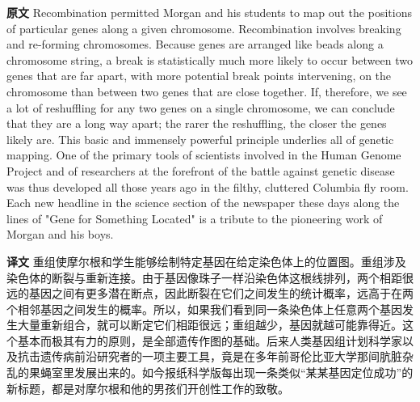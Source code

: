 \documentclass[UTF8,zihao=-4]{ctexart}
\newcommand{\BodyFont}{\fontsize{10.5pt}{15.5pt}\selectfont}
\renewenvironment{quote}{\par\noindent\begingroup\BodyFont}{\par\endgroup}
\begin{document}
\begin{quote}
\noindent\textbf{原文} Recombination permitted Morgan and his students to map out the positions of particular genes along a given chromosome. Recombination involves breaking and re-forming chromosomes. Because genes are arranged like beads along a chromosome string, a break is statistically much more likely to occur between two genes that are far apart, with more potential break points intervening, on the chromosome than between two genes that are close together. If, therefore, we see a lot of reshuffling for any two genes on a single chromosome, we can conclude that they are a long way apart; the rarer the reshuffling, the closer the genes likely are. This basic and immensely powerful principle underlies all of genetic mapping. One of the primary tools of scientists involved in the Human Genome Project and of researchers at the forefront of the battle against genetic disease was thus developed all those years ago in the filthy, cluttered Columbia fly room. Each new headline in the science section of the newspaper these days along the lines of "Gene for Something Located" is a tribute to the pioneering work of Morgan and his boys.

\smallskip
\noindent\textbf{译文} 重组使摩尔根和学生能够绘制特定基因在给定染色体上的位置图。重组涉及染色体的断裂与重新连接。由于基因像珠子一样沿染色体这根线排列，两个相距很远的基因之间有更多潜在断点，因此断裂在它们之间发生的统计概率，远高于在两个相邻基因之间发生的概率。所以，如果我们看到同一条染色体上任意两个基因发生大量重新组合，就可以断定它们相距很远；重组越少，基因就越可能靠得近。这个基本而极其有力的原则，是全部遗传作图的基础。后来人类基因组计划科学家以及抗击遗传病前沿研究者的一项主要工具，竟是在多年前哥伦比亚大学那间肮脏杂乱的果蝇室里发展出来的。如今报纸科学版每出现一条类似“某某基因定位成功”的新标题，都是对摩尔根和他的男孩们开创性工作的致敬。
\end{quote}
\end{document}
